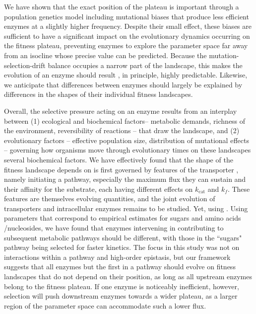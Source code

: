 \documentclass[11pt,onecolumn]{article}
\providecommand{\DIFadd}[1]{{\protect\color{blue} \sf #1}} %
\providecommand{\DIFdel}[1]{{\protect\color{red} \scriptsize #1}} %
\providecommand{\DIFaddbegin}{} %
\providecommand{\DIFaddend}{} %
\providecommand{\DIFdelbegin}{} %
\providecommand{\DIFdelend}{} %
\begin{document}
\DIFadd{We have shown that }\DIFaddend the \DIFaddbegin \DIFadd{exact position of the plateau is important through a population genetics model including mutational biases that produce less efficient enzymes at a slightly higher frequency. Despite their small effect, these biases are sufficient to have a significant impact on the evolutionary dynamics occurring on the fitness plateau, preventing enzymes to explore the parameter space far away from an isocline whose precise value can be predicted. Because the mutation-selection-drift balance occupies a narrow part of the landscape, this makes the }\DIFaddend evolution of an enzyme\DIFdelbegin \DIFdel{should result }\DIFdelend \DIFaddbegin \DIFadd{, in principle, highly predictable. Likewise, we anticipate that differences between enzymes should largely be explained by differences in the shapes of their individual fitness landscapes. 
}

\DIFadd{Overall, the selective pressure acting on an enzyme results }\DIFaddend from an interplay between \DIFdelbegin \DIFdel{(1) ecological and biochemical factors-- metabolic demands, richness of the environment, reversibility of reactions -- that draw the landscape, and (2) evolutionary factors -- effective population size, distribution of mutational effects -- governing how organisms move through evolutionary times on these landscapes}\DIFdelend \DIFaddbegin \DIFadd{several biochemical factors}\DIFaddend . We have effectively found that the shape of the fitness landscape \DIFdelbegin \DIFdel{depends on }\DIFdelend \DIFaddbegin \DIFadd{is first governed by }\DIFaddend features of the transporter \DIFdelbegin \DIFdel{, namely }\DIFdelend \DIFaddbegin \DIFadd{initiating a pathway, especially }\DIFaddend the maximum flux they can sustain\DIFdelbegin \DIFdel{and their affinity for the substrate, each having different effects on $k_\text{cat}$ and $k_f$. These features are themselves evolving quantities, and the joint evolution of transporters and intracellular enzymes remains to be studied. Yet, using }\DIFdelend \DIFaddbegin \DIFadd{. Using }\DIFaddend parameters that correspond to empirical estimates for sugars and amino acids\DIFaddbegin \DIFadd{/nucleosides}\DIFaddend , we have found that enzymes \DIFdelbegin \DIFdel{intervening in }\DIFdelend \DIFaddbegin \DIFadd{contributing to }\DIFaddend subsequent metabolic pathways should be different, with those in the ``sugars" pathway being selected for faster kinetics.
\DIFdelbegin \DIFdel{The focus in this study was not on interactions within a pathway and high-order epistasis, but our framework suggests that all enzymes but the first in a pathway should evolve on fitness landscapes that do not depend on their position, as long as all upstream enzymes belong to the fitness plateau. If one enzyme is noticeably inefficient, however, selection will push downstream enzymes towards a wider plateau, as a larger region of the parameter space can accommodate such a lower flux.
}\DIFdelend 
\end{document}
